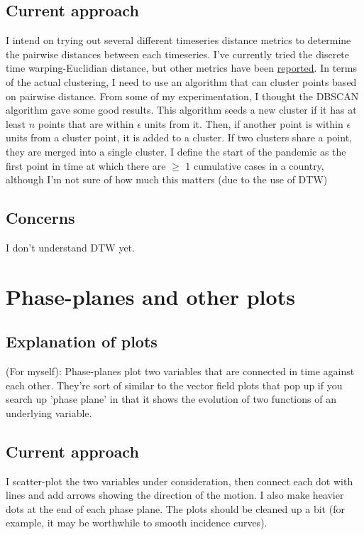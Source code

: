 \documentclass{article}
\begin{document}
\subsection{Current approach}
I intend on trying out several different timeseries distance metrics to determine the pairwise distances between each timeseries. I've currently tried the discrete time warping-Euclidian distance, but other metrics have been \href{https://link.springer.com/chapter/10.1007/978-3-030-28665-1_31}{reported}. In terms of the actual clustering, I need to use an algorithm that can cluster points based on pairwise distance. From some of my experimentation, I thought the DBSCAN algorithm gave some good results. This algorithm seeds a new cluster if it has at least $n$ points that are within $\epsilon$ units from it. Then, if another point is within $\epsilon$ units from a cluster point, it is added to a cluster. If two clusters share a point, they are merged into a single cluster. I define the start of the pandemic as the first point in time at which there are $\geq$ 1 cumulative cases in a country, although I'm not sure of how much this matters (due to the use of DTW)

\subsection{Concerns}
I don't understand DTW yet. 

\section{Phase-planes and other plots}
\subsection{Explanation of plots}
(For myself): Phase-planes plot two variables that are connected in time against each other. They're sort of similar to the vector field plots that pop up if you search up 'phase plane' in that it shows the evolution of two functions of an underlying variable.

\subsection{Current approach}
I scatter-plot the two variables under consideration, then connect each dot with lines and add arrows showing the direction of the motion. I also make heavier dots at the end of each phase plane. The plots should be cleaned up a bit (for example, it may be worthwhile to smooth incidence curves).
\end{document}
